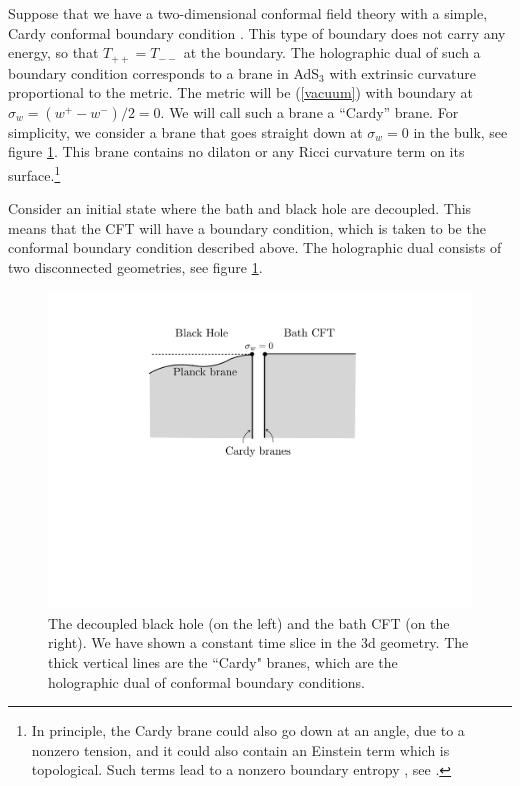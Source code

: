 \documentclass[12pt]{article}
\def\nref#1{(\ref{#1})}
\begin{document}
Suppose that we have a two-dimensional conformal field theory with a simple, Cardy conformal boundary condition \cite{Cardy:1989ir}. 
This type of boundary does not carry any energy, so that $T_{++} = T_{--}$ at the boundary.
The holographic dual of such a boundary condition corresponds to a brane in AdS$_3$ with extrinsic curvature proportional to the metric.
The metric will be \nref{vacuum} with boundary at $\sigma_w = (w^+ -w^-)/2 =0$. 
We will call such a brane a ``Cardy'' brane.
For simplicity, we consider a  brane that goes straight down at $\sigma_w =0$ in the bulk, see figure \ref{SimpleBrane}. 
This brane contains no dilaton or any Ricci curvature term on its surface.\footnote{In principle, the Cardy brane could also go down at an angle, due to a nonzero tension,  and it could also  contain an Einstein term which is topological. Such terms lead to a nonzero  boundary entropy \cite{Affleck:1991tk},  see \cite{Takayanagi:2011zk}.}

Consider an initial state where the bath and black hole are decoupled.
This means that the CFT will have a boundary condition, which is taken to be the conformal boundary condition described above.
The holographic dual consists of two disconnected geometries, see figure \ref{SimpleBrane}. 
    
\begin{figure}[ht]
    \begin{center}
    \includegraphics[scale=.5]{Figures/SimpleBrane}
    \end{center}
    \caption{The decoupled black hole (on the left) and the bath CFT (on the right). We have shown a constant time slice in the 3d geometry. The thick vertical lines are the ``Cardy" branes, which are the holographic dual of conformal boundary conditions.}
    \label{SimpleBrane}
\end{figure}
\end{document}
